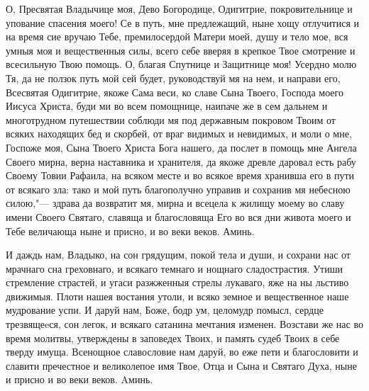 \mychapterending


\begin{mymulticols}



О, Пресвятая Владычице моя, Дево Богородице, Одигитрие, покровительнице и упование спасения моего! Се в путь, мне предлежащий, ныне хощу отлучитися и на время сие вручаю Тебе, премилосердой Матери моей, душу и тело мое, вся умныя моя и вещественныя силы, всего себе вверяя в крепкое Твое смотрение и всесильную Твою помощь. О, благая Спутнице и Защитнице моя! Усердно молю Тя, да не ползок путь мой сей будет, руководствуй мя на нем, и направи его, Всесвятая Одигитрие, якоже Сама веси, ко славе Сына Твоего, Господа моего Иисуса Христа, буди ми во всем помощнице, наипаче же в сем дальнем и многотрудном путешествии соблюди мя под державным покровом Твоим от всяких находящих бед и скорбей, от враг видимых и невидимых, и моли о мне, Госпоже моя, Сына Твоего Христа Бога нашего, да послет в помощь мне Ангела Своего мирна, верна наставника и хранителя, да якоже древле даровал есть рабу Своему Товии Рафаила, на всяком месте и во всякое время хранивша его в пути от всякаго зла: тако и мой путь благополучно управив и сохранив мя небесною силою,"--- здрава да возвратит мя, мирна и всецела к жилищу моему во славу имени Своего Святаго, славяща и благословяща Его во вся дни живота моего и Тебе величающа ныне и присно, и во веки веков. Аминь.

\end{mymulticols}

\mychapterending


\begin{mymulticols}



И даждь нам, Владыко, на сон грядущим, покой тела и души, и сохрани нас от мрачнаго сна греховнаго, и всякаго темнаго и нощнаго сладострастия. Утиши стремление страстей, и угаси разжженныя стрелы лукаваго, яже на ны льстиво движимыя. Плоти нашея востания утоли, и всяко земное и вещественное наше мудрование успи. И даруй нам, Боже, бодр ум, целомудр помысл, сердце трезвящеeся, сон легок, и всякаго сатанина мечтания изменен. Возстави же нас во время молитвы, утверждены в заповедех Твоих, и память судеб Твоих в себе тверду имуща. Всенощное славословие нам даруй, во еже пети и благословити и славити пречестное и великолепое имя Твое, Отца и Сына и Святаго Духа, ныне и присно и во веки веков. Aминь.




\end{mymulticols}

